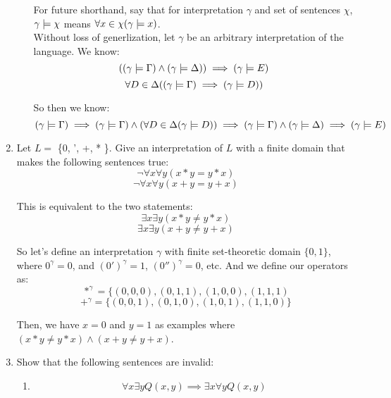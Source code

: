 \begin{enumerate}
\begin{enumerate}
        For future shorthand, say that for interpretation $\gamma$ and set of sentences $\chi$, $\gamma \mathrel{|}\!= \chi$ means $\forall x \in \chi (\gamma \mathrel{|}\!= x)$.\\

        Without loss of generlization, let $\gamma$ be an arbitrary interpretation of the language. We know: 
        $$((\gamma \mathrel{|}\!= \Gamma) \land (\gamma \mathrel{|}\!= \Delta)) \implies (\gamma \mathrel{|}\!= E)$$
        $$\forall D \in \Delta ((\gamma \mathrel{|}\!= \Gamma) \implies (\gamma \mathrel{|}\!= D))$$

        So then we know:
        $$(\gamma \mathrel{|}\!= \Gamma) \implies (\gamma \mathrel{|}\!= \Gamma) \land (\forall D \in \Delta (\gamma \mathrel{|}\!= D)) \implies (\gamma \mathrel{|}\!= \Gamma) \land (\gamma \mathrel{|}\!= \Delta) \implies (\gamma \mathrel{|}\!= E)$$
        
    \end{enumerate}

  \item 
    \begin{question}
      Let $L = $ \{0, ', +, * \}. Give an interpretation of $L$ with a finite domain that makes the following sentences true:
      $$\neg \forall x \forall y (x * y = y * x)$$
      $$\neg \forall x \forall y (x+y = y+x)$$
    \end{question}

    This is equivalent to the two statements:
    $$\exists x \exists y (x * y \neq y * x)$$
    $$\exists x \exists y (x + y \neq y + x)$$

    So let's define an interpretation $\gamma$ with finite set-theoretic domain $\{0,1\}$, where $0^{\gamma} = 0$, and $(0')^{\gamma} = 1$, $(0'')^{\gamma} = 0$, etc. And we define our operators as:
    $$*^{\gamma} = \{(0,0,0), (0,1,1), (1,0,0), (1,1,1)$$
    $$+^{\gamma} = \{(0,0,1), (0,1,0), (1,0,1), (1,1,0)\}$$

    Then, we have $x = 0$ and $y=1$ as examples where $(x*y \neq y*x) \land (x+y \neq y+x)$.

  \item
    \begin{question}
      Show that the following sentences are invalid:
    \end{question}
    \begin{enumerate}
      \item 
        \begin{question}
          $$\forall x \exists y Q(x,y) \implies \exists x \forall y Q(x,y)$$
        \end{question}


\end{enumerate}
\end{enumerate}
